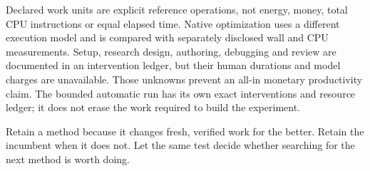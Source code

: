 Declared work units are explicit reference operations, not energy, money, total CPU instructions or equal elapsed time. Native optimization uses a different execution model and is compared with separately disclosed wall and CPU measurements. Setup, research design, authoring, debugging and review are documented in an intervention ledger, but their human durations and model charges are unavailable. Those unknowns prevent an all-in monetary productivity claim. The bounded automatic run has its own exact interventions and resource ledger; it does not erase the work required to build the experiment.

\begin{insight}
Retain a method because it changes fresh, verified work for the better. Retain the incumbent when it does not. Let the same test decide whether searching for the next method is worth doing.
\end{insight}
